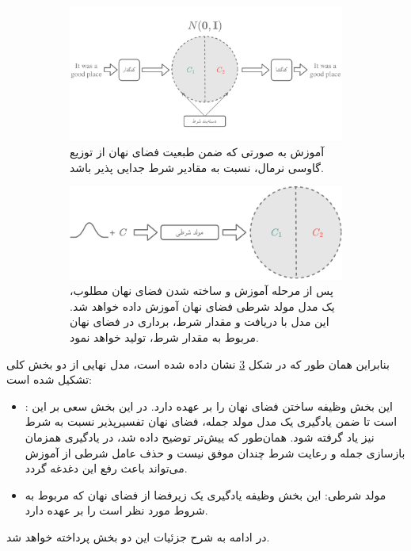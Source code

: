 \begin{figure}[h]
    \centering
    \begin{subfigure}{0.6\textheight}
        \centering
        \includegraphics[width=1.\textwidth]{images/propwae.pdf}
        \caption{
            آموزش \autoencoder{} به صورتی که ضمن طبعیت فضای نهان از توزیع گاوسی نرمال، نسبت به مقادیر شرط جدایی پذیر باشد.
        }
        \label{fig:chap4:propwae}
    \end{subfigure}
    \begin{subfigure}{0.5\textheight}
    \centering
    \includegraphics[width=1.\textwidth]{images/propflow.pdf}
    \caption{
پس از مرحله آموزش \autoencoder{} و ساخته شدن فضای نهان مطلوب، یک مدل مولد شرطی فضای نهان آموزش داده خواهد شد. این مدل با دریافت \noise{} و مقدار شرط، برداری در فضای نهان مربوط به مقدار شرط، تولید خواهد نمود.
    }
    \label{fig:chap4:propflow}
\end{subfigure}
\caption{}
    \label{fig:chap4:prop}
\end{figure}
بنابراین همان طور که در شکل \ref{fig:chap4:prop} نشان داده شده است، مدل نهایی از دو بخش کلی تشکیل شده است:
\begin{itemize}
	\item \autoencoder{}:
	      این بخش وظیفه ساختن فضای نهان را بر عهده دارد. در این بخش سعی بر این است تا ضمن یادگیری یک مدل مولد جمله، فضای نهان تفسیرپذیر نسبت به شرط نیز یاد گرفته شود. همان‌طور که ییش‌تر توضیح داده شد، \vae{} در یادگیری همزمان بازسازی جمله و رعایت شرط چندان موفق نیست و حذف عامل شرطی از آموزش \decoder{} می‌تواند باعث رفع این دغدغه گردد.
	\item
	      مولد شرطی: این بخش وظیفه یادگیری یک زیرفضا از فضای نهان که مربوط به شروط مورد نظر است را بر عهده دارد.
\end{itemize}
در ادامه به شرح جزئیات این دو بخش پرداخته خواهد شد.

